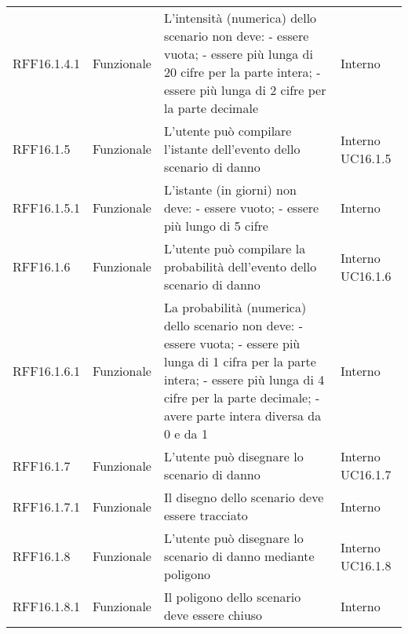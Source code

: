 \begin{longtable}{p{2cm}!{\VRule[1pt]}p{2cm}!{\VRule[1pt]}p{5cm}!{\VRule[1pt]}p{1.5cm}}
	\\
	RFF16.1.4.1&Funzionale\newline  & L'intensità (numerica) dello scenario non deve:
	- essere vuota;
	- essere più lunga di 20 cifre per la
	parte intera; 
	- essere più lunga di 2 cifre per la parte decimale & Interno \\
	RFF16.1.5                        & Funzionale\newline               & L'utente può compilare l'istante dell'evento dello scenario di danno                                                     & Interno \newline UC16.1.5    
	\\
	RFF16.1.5.1&Funzionale\newline  & L'istante (in giorni) non deve:
	- essere vuoto;
	- essere più lungo di 5 cifre & Interno \\
	RFF16.1.6                        & Funzionale\newline               & L'utente può compilare la probabilità  dell'evento dello scenario di danno                                              & Interno \newline UC16.1.6    
	\\
	RFF16.1.6.1&Funzionale\newline  & La probabilità (numerica) dello scenario non deve:
	- essere vuota;
	- essere più lunga di 1 cifra per la parte intera; 
	- essere più lunga di 4 cifre per la parte decimale;
	- avere parte intera diversa da 0 e da 1 & Interno \\
	RFF16.1.7                        & Funzionale\newline               & L'utente può disegnare lo scenario di danno                                                                              & Interno \newline UC16.1.7    
	\\
	RFF16.1.7.1                      & Funzionale\newline               & Il disegno dello scenario deve essere tracciato                                                                           & Interno                      \\
	RFF16.1.8                        & Funzionale\newline               & L'utente può disegnare lo scenario di danno mediante poligono                                                            & Interno \newline UC16.1.8    
	\\
	RFF16.1.8.1                      & Funzionale\newline               & Il poligono dello scenario deve essere chiuso                                                                             & Interno                      \\

\end{longtable}
